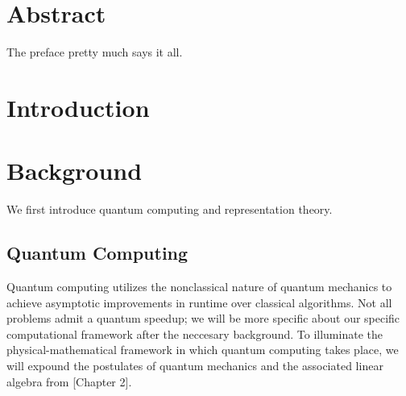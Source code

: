\documentclass[12pt,twoside]{reedthesis}
\theoremstyle{plain}   %
\theoremstyle{definition}
\theoremstyle{remark}
\numberwithin{equation}{section}
\begin{document}
        \tableofcontents
        \listoftables
        \listoffigures

        \mainmatter %
        \pagestyle{fancyplain} %
        
        \chapter*{Abstract}
	The preface pretty much says it all.
	\onehalfspacing

	

        \chapter*{Introduction}
        
    \chapter{Background}
    
   We first introduce quantum computing and representation theory.
   \section{Quantum Computing}
   Quantum computing utilizes the nonclassical nature of quantum mechanics to achieve asymptotic improvements in runtime over classical algorithms.
   Not all problems admit a quantum speedup; we will be more specific about our specific computational framework after the neccesary background.
   To illuminate the physical-mathematical framework in which quantum computing takes place, we will expound the postulates of quantum mechanics and the associated linear algebra from \cite{nielsen2010}[Chapter 2].
\end{document}

